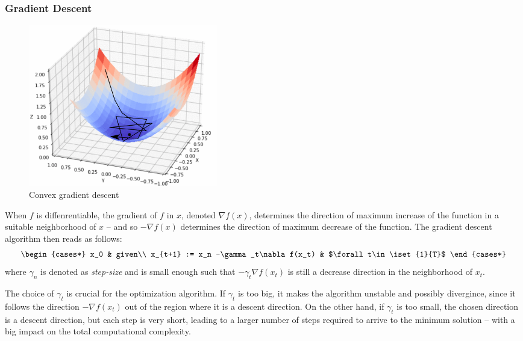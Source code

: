 \documentclass[toc, titlepaged]{../cs-classes/cs-classes}
\begin{document}
\subsubsection{Gradient Descent}
\begin{figure}
    \captionsetup{justification=centering}
    \includegraphics[width=0.4\textwidth]{images/gradient-descent-2.png}
    \caption{Convex gradient descent}
\end{figure}
When $f$ is diffenrentiable, the gradient of $f$ in $x$, denoted $\nabla f(x)$, determines the direction of maximum increase of the function in a suitable neighborhood of $x$ -- and so $-\nabla f(x)$ determines the direction of maximum decrease of the function. The gradient descent algorithm then reads as follows:
\begin{equation*}
    \begin{cases*}
        x_0 & given\\
        x_{t+1} := x_n -\gamma_t\nabla f(x_t) & $\forall t\in\iset{1}{T}$
    \end{cases*}
\end{equation*}
where $\gamma_n$ is denoted as \emph{step-size} and is small enough such that $-\gamma_t\nabla f(x_t)$ is still a decrease direction in the neighborhood of $x_t$.

The choice of $\gamma_t$ is crucial for the optimization algorithm. If $\gamma_t$ is too big, it makes the algorithm unstable and possibly divergince, since it follows the direction $-\nabla f(x_t)$ out of the region where it is a descent direction. On the other hand, if $\gamma_t$ is too small, the chosen direction is a descent direction, but each step is very short, leading to a larger number of steps required to arrive to the minimum solution -- with a big impact on the total computational complexity.
\end{document}
